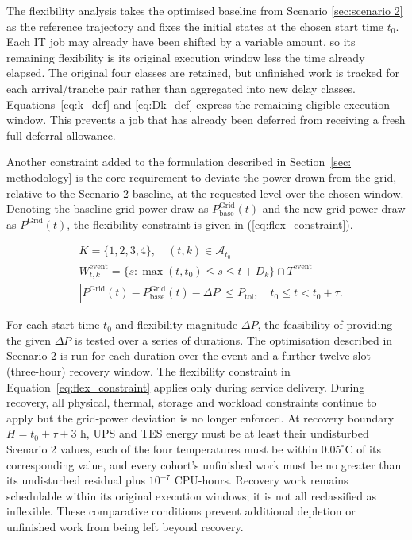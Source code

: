 \documentclass[lettersize,journal]{IEEEtran}
\newcommand{\rev}[1]{#1}
\begin{document}
The flexibility analysis takes the optimised baseline from Scenario \ref{sec:scenario 2} as the reference trajectory and fixes the initial states at the chosen start time $t_0$. Each IT job may already have been shifted by a variable amount, so its remaining flexibility is its original execution window less the time already elapsed. The original four classes are retained, but unfinished work is tracked for each arrival/tranche pair rather than aggregated into new delay classes. Equations~\ref{eq:k_def} and \ref{eq:Dk_def} express the remaining eligible execution window. This prevents a job that has already been deferred from receiving a fresh full deferral allowance.

Another constraint added to the formulation described in Section~\ref{sec: methodology} is the core requirement to deviate the power drawn from the grid, relative to the Scenario 2 baseline, at the requested level over the chosen window. Denoting the baseline grid power draw as $P^{\mathrm{Grid}}_{\mathrm{base}}(t)$ and the new grid power draw as $P^{\mathrm{Grid}}(t)$, the flexibility constraint is given in (\ref{eq:flex_constraint}).

\begin{align}
& K=\{1,2,3,4\},\quad (t,k)\in\mathcal A_{t_0} \label{eq:k_def} \\
& W^{\mathrm{event}}_{t,k}=\{s:\max(t,t_0)\leq s\leq t+D_k\}\cap T^{\mathrm{event}} \label{eq:Dk_def} \\
& \left|P^{\mathrm{Grid}}(t)-P^{\mathrm{Grid}}_{\mathrm{base}}(t)-\Delta P\right|\leq P_{\mathrm{tol}},\quad t_0\leq t<t_0+\tau. \label{eq:flex_constraint}
\end{align}

For each start time $t_0$ and flexibility magnitude $\Delta P$, the feasibility of providing the given $\Delta P$ is tested over a series of durations. \rev{The optimisation described in Scenario 2 is run for each duration over the event and a further twelve-slot (three-hour) recovery window. The flexibility constraint in Equation~\ref{eq:flex_constraint} applies only during service delivery. During recovery, all physical, thermal, storage and workload constraints continue to apply but the grid-power deviation is no longer enforced.} At recovery boundary $H=t_0+\tau+3$ h, UPS and TES energy must be at least their undisturbed Scenario 2 values, each of the four temperatures must be within $0.05^\circ$C of its corresponding value, and every cohort's unfinished work must be no greater than its undisturbed residual plus $10^{-7}$ CPU-hours. Recovery work remains schedulable within its original execution windows; it is not all reclassified as inflexible. These comparative conditions prevent additional depletion or unfinished work from being left beyond recovery.
\end{document}

